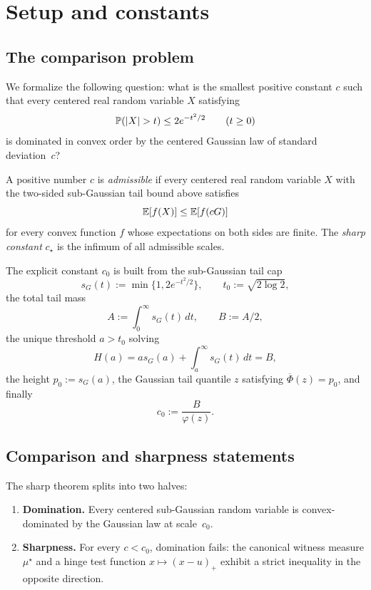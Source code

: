 \chapter{Setup and constants}\label{chap:setup}

\section{The comparison problem}

We formalize the following question: what is the smallest positive constant
$c$ such that every centered real random variable $X$ satisfying
\[
  \mathbb{P}(|X| > t) \le 2 e^{-t^2/2} \qquad (t \ge 0)
\]
is dominated in convex order by the centered Gaussian law of standard
deviation~$c$?

\begin{definition}\label{def:endpoint}
\leanok
{}\leanok
A positive number $c$ is \emph{admissible} if every centered real random
variable $X$ with the two-sided sub-Gaussian tail bound above satisfies
\[
  \mathbb{E}[f(X)] \le \mathbb{E}[f(cG)]
\]
for every convex function $f$ whose expectations on both sides are finite.
The \emph{sharp constant} $c_\star$ is the infimum of all admissible scales.
\end{definition}

\begin{definition}\label{def:constants}
\leanok
{}\leanok
{}\leanok
{}\leanok
{}\leanok
{}\leanok
{}\leanok
{}\leanok
The explicit constant $c_0$ is built from the sub-Gaussian tail cap
\[
  s_G(t) := \min\{1, 2e^{-t^2/2}\}, \qquad
  t_0 := \sqrt{2 \log 2},
\]
the total tail mass
\[
  A := \int_0^\infty s_G(t)\,dt, \qquad B := A/2,
\]
the unique threshold $a > t_0$ solving
\[
  H(a) = a s_G(a) + \int_a^\infty s_G(t)\,dt = B,
\]
the height $p_0 := s_G(a)$, the Gaussian tail quantile $z$ satisfying
$\overline{\Phi}(z) = p_0$, and finally
\[
  c_0 := \frac{B}{\varphi(z)}.
\]
\end{definition}

\section{Comparison and sharpness statements}

The sharp theorem splits into two halves:

\begin{theorem}\label{thm:public-support}
\leanok
{}\leanok
\begin{enumerate}
\item \textbf{Domination.} Every centered sub-Gaussian random variable
  is convex-dominated by the Gaussian law at scale~$c_0$.
\item \textbf{Sharpness.} For every $c < c_0$, domination fails:
  the canonical witness measure $\mu^\star$ and a hinge test function
  $x \mapsto (x-u)_+$ exhibit a strict inequality in the opposite direction.
\end{enumerate}
\end{theorem}

